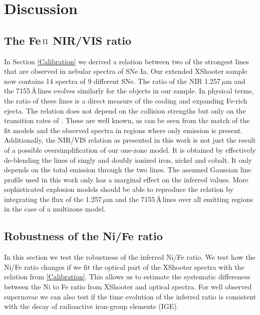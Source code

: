 \documentclass[fleqn,usenatbib]{mnras}
\begin{document}
\section{Discussion}
\subsection{The Fe$\,\textsc{II}$ NIR/VIS ratio}
In Section \ref{Calibration} we derived a relation between two of the strongest  lines that are observed in nebular spectra of SNe Ia. Our extended XShooter sample now contains 14 spectra of 9 different SNe. The ratio of the NIR 1.257\,$\mu$m and the 7155\,\AA\,lines evolves similarly for the objects in our sample. In physical terms, the ratio of these lines is a direct measure of the cooling and expanding Fe-rich ejecta. The relation does not depend on the collision strengths but only on the transition rates of . These are well known, as can be seen from the match of the fit models and the observed spectra in regions where only  emission is present. Additionally, the  NIR/VIS relation as presented in this work is not just the result of a possible oversimplification of our one-zone model. It is obtained by effectively de-blending the lines of singly and doubly ionized iron, nickel and cobalt. It only depends on the total emission through the two lines. The assumed Gaussian line profile used in this work only has a marginal effect on the inferred values. More sophisticated explosion models should be able to reproduce the relation by integrating the flux of the 1.257\,$\mu$m and the 7155\,\AA\,lines over all emitting regions in the case of a multizone model.

\subsection{Robustness of the Ni/Fe ratio}
\label{NiFeTest}
In this section we test the robustness of the inferred Ni/Fe ratio. We test how the Ni/Fe ratio changes if we fit the optical part of the XShooter spectra with the relation from \ref{Calibration}. This allows us to estimate the systematic differences between the Ni to Fe ratio from XShooter and optical spectra. For well observed supernovae we can also test if the time evolution of the inferred ratio is consistent with the decay of radioactive iron-group elements (IGE).
\end{document}
